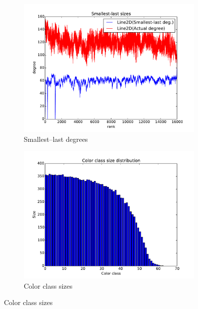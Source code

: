 \documentclass[oneside, titlepage]{scrartcl}
\begin{document}
\begin{figure}[!h]
\begin{subfigure}{0.5\textwidth}
	\centering
	\includegraphics[width=0.9\linewidth]{figures/ordering9.pdf}
	\caption{Smallest--last degrees}
\end{subfigure}%
\begin{subfigure}{0.5\textwidth}
	\centering
	\includegraphics[width=0.9\linewidth]{figures/colors9.pdf}
	\caption{Color class sizes}
\end{subfigure}


\end{figure}
\end{document}
